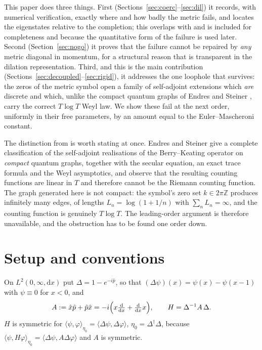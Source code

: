 \documentclass[11pt,a4paper]{article}
\theoremstyle{remark}
\newcommand{\Z}{\mathbb{Z}}
\newcommand{\dd}{\mathrm{d}}
\begin{document}
This paper does three things. First (Sections~\ref{sec:coerc}--\ref{sec:dil}) it records, with
numerical verification, exactly where and how badly the metric fails, and locates the eigenstates
relative to the completion; this overlaps with \cite{Liu2026} and is included for completeness and
because the quantitative form of the failure is used later. Second
(Section~\ref{sec:nogo}) it proves that the failure cannot be repaired by \emph{any} metric
diagonal in momentum, for a structural reason that is transparent in the dilation representation.
Third, and this is the main contribution (Sections~\ref{sec:decoupled}--\ref{sec:rigid}), it
addresses the one loophole that survives: the zeros of the metric symbol open a family of
self-adjoint extensions which \emph{are} discrete and which, unlike the compact quantum graphs of
Endres and Steiner \cite{EndresSteiner2010}, carry the correct $T\log T$ Weyl law. We show these
fail at the next order, uniformly in their free parameters, by an amount equal to the
Euler--Mascheroni constant.

The distinction from \cite{EndresSteiner2010} is worth stating at once. Endres and Steiner give a
complete classification of the self-adjoint realisations of the Berry--Keating operator on
\emph{compact} quantum graphs, together with the secular equation, an exact trace formula and the
Weyl asymptotics, and observe that the resulting counting functions are linear in $T$ and
therefore cannot be the Riemann counting function. The graph generated here is not compact: the
symbol's zero set $k\in2\pi\Z$ produces infinitely many edges, of lengths $L_n=\log(1+1/n)$ with
$\sum_nL_n=\infty$, and the counting function is genuinely $T\log T$. The leading-order argument is
therefore unavailable, and the obstruction has to be found one order down.

\section{Setup and conventions}\label{sec:setup}

On $L^2(0,\infty,\dd x)$ put $\Delta=1-e^{-i\hat p}$, so that $(\Delta\psi)(x)=\psi(x)-\psi(x-1)$
with $\psi\equiv0$ for $x<0$, and
\[
A:=\hat x\hat p+\hat p\hat x=-i\Bigl(x\tfrac{\dd}{\dd x}+\tfrac{\dd}{\dd x}x\Bigr),
\qquad H=\Delta^{-1}A\,\Delta .
\]
$H$ is symmetric for
$\langle\psi,\varphi\rangle_{\eta_0}=\langle\Delta\psi,\Delta\varphi\rangle$, $\eta_0=\Delta^\dagger\Delta$,
because $\langle\psi,H\varphi\rangle_{\eta_0}=\langle\Delta\psi,A\Delta\varphi\rangle$ and $A$ is
symmetric.
\end{document}
